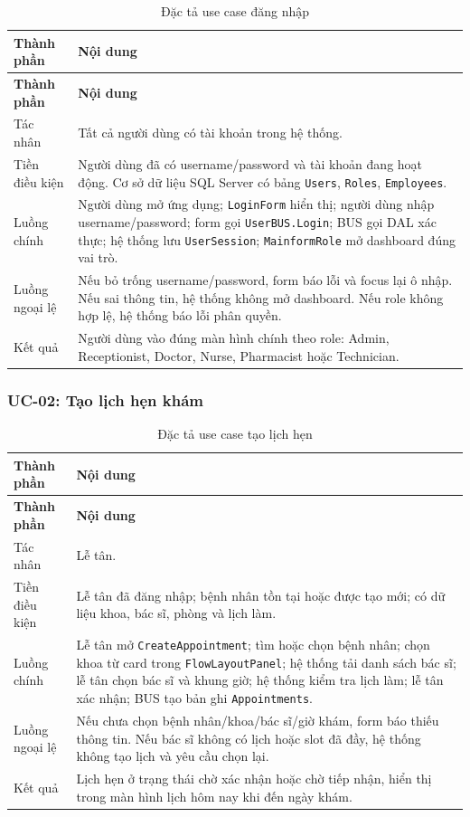 \documentclass[12pt,a4paper]{article}
\numberwithin{figure}{subsection}
\numberwithin{table}{subsection}
\begin{document}
\begin{longtable}{|p{3.4cm}|p{10.4cm}|}
\caption{Đặc tả use case đăng nhập} \\
\hline
\textbf{Thành phần} & \textbf{Nội dung} \\
\hline
\endfirsthead
\hline
\textbf{Thành phần} & \textbf{Nội dung} \\
\hline
\endhead
Tác nhân & Tất cả người dùng có tài khoản trong hệ thống. \\
\hline
Tiền điều kiện & Người dùng đã có username/password và tài khoản đang hoạt động. Cơ sở dữ liệu SQL Server có bảng \texttt{Users}, \texttt{Roles}, \texttt{Employees}. \\
\hline
Luồng chính & Người dùng mở ứng dụng; \texttt{LoginForm} hiển thị; người dùng nhập username/password; form gọi \texttt{UserBUS.Login}; BUS gọi DAL xác thực; hệ thống lưu \texttt{UserSession}; \texttt{MainformRole} mở dashboard đúng vai trò. \\
\hline
Luồng ngoại lệ & Nếu bỏ trống username/password, form báo lỗi và focus lại ô nhập. Nếu sai thông tin, hệ thống không mở dashboard. Nếu role không hợp lệ, hệ thống báo lỗi phân quyền. \\
\hline
Kết quả & Người dùng vào đúng màn hình chính theo role: Admin, Receptionist, Doctor, Nurse, Pharmacist hoặc Technician. \\
\hline
\end{longtable}

\subsubsection{UC-02: Tạo lịch hẹn khám}

\begin{longtable}{|p{3.4cm}|p{10.4cm}|}
\caption{Đặc tả use case tạo lịch hẹn} \\
\hline
\textbf{Thành phần} & \textbf{Nội dung} \\
\hline
\endfirsthead
\hline
\textbf{Thành phần} & \textbf{Nội dung} \\
\hline
\endhead
Tác nhân & Lễ tân. \\
\hline
Tiền điều kiện & Lễ tân đã đăng nhập; bệnh nhân tồn tại hoặc được tạo mới; có dữ liệu khoa, bác sĩ, phòng và lịch làm. \\
\hline
Luồng chính & Lễ tân mở \texttt{CreateAppointment}; tìm hoặc chọn bệnh nhân; chọn khoa từ card trong \texttt{FlowLayoutPanel}; hệ thống tải danh sách bác sĩ; lễ tân chọn bác sĩ và khung giờ; hệ thống kiểm tra lịch làm; lễ tân xác nhận; BUS tạo bản ghi \texttt{Appointments}. \\
\hline
Luồng ngoại lệ & Nếu chưa chọn bệnh nhân/khoa/bác sĩ/giờ khám, form báo thiếu thông tin. Nếu bác sĩ không có lịch hoặc slot đã đầy, hệ thống không tạo lịch và yêu cầu chọn lại. \\
\hline
Kết quả & Lịch hẹn ở trạng thái chờ xác nhận hoặc chờ tiếp nhận, hiển thị trong màn hình lịch hôm nay khi đến ngày khám. \\
\hline
\end{longtable}
\end{document}
